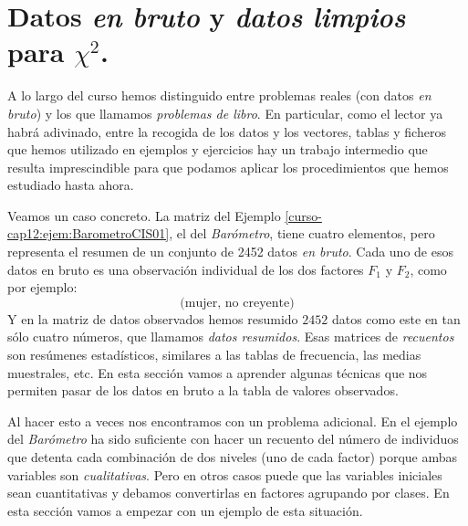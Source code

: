 \documentclass[10pt,a4paper]{article}\usepackage[]{graphicx}\usepackage[]{color}
\newcounter {cont01}
\begin{document}
\section{Datos {\em en bruto} y {\em datos limpios} para $\chi^2$.}
\label{tut12:sec:DatosEnBrutoLimpiosChiCuadrado}


A lo largo del curso hemos distinguido entre problemas reales (con datos {\em en bruto}) y  los que llamamos {\em problemas de libro}. En particular, como el lector ya habrá adivinado, entre la recogida de los datos y los vectores, tablas y ficheros que hemos utilizado en ejemplos y ejercicios hay un trabajo intermedio que resulta imprescindible para que podamos aplicar los procedimientos que hemos estudiado hasta ahora.

Veamos un caso concreto. La matriz del Ejemplo \ref{curso-cap12:ejem:BarometroCIS01}, el del {\em Barómetro}, tiene cuatro elementos, pero representa el resumen de un conjunto de 2452 datos {\em en bruto}. Cada uno de esos datos en bruto es una observación individual de los dos factores $F_1$ y $F_2$, como por ejemplo:
\[\mbox{(mujer, no creyente)}\]
Y en la matriz de datos observados hemos resumido $2452$ datos como este en tan sólo cuatro números, que llamamos {\em datos resumidos}. Esas matrices de {\em recuentos} son resúmenes estadísticos, similares a las tablas de frecuencia, las medias muestrales, etc. En esta sección vamos a aprender algunas técnicas que nos permiten pasar de los datos en bruto a la tabla de valores observados.

Al hacer esto a veces nos encontramos con un problema adicional. En el ejemplo del {\em Barómetro}  ha sido suficiente con hacer un recuento del número de individuos que detenta cada combinación de dos niveles (uno de cada factor) porque ambas variables son {\em cualitativas}. Pero en otros casos puede que las variables iniciales sean cuantitativas y debamos convertirlas en factores agrupando por clases. En esta sección vamos a empezar con un ejemplo de esta situación.
\end{document}
